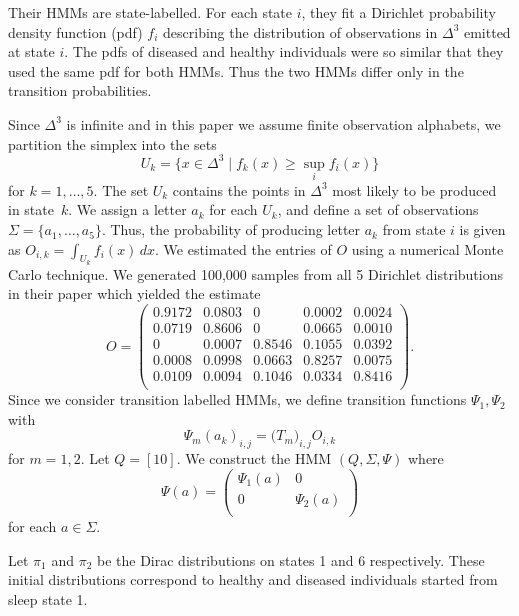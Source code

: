 \documentclass[a4paper,UKenglish,cleveref, autoref,mathscr]{lipics-v2019}
\newcommand{\1}{\mathbbm{1}}
\begin{document}
Their HMMs are state-labelled.
For each state $i$, they fit a Dirichlet probability density function (pdf) $f_i$ describing the distribution of observations in $\Delta^3$ emitted at state $i$.
The pdfs of diseased and healthy individuals were so similar that they used the same pdf for both HMMs. %
Thus the two HMMs differ only in the transition probabilities.

Since $\Delta^3$ is infinite and in this paper we assume finite observation alphabets, we partition the simplex into the sets
\[
 U_k = \{x \in \Delta^3 \mid f_k(x) \geq \sup_{i} f_i(x)\}
\]
for $k = 1, \dots, 5$.
The set $U_k$ contains the points in $\Delta^3$ most likely to be produced in state~$k$.
We assign a letter $a_k$ for each $U_k$, and define a set of observations $\Sigma = \{a_1, \dots, a_5\}$.
Thus, the probability of producing letter $a_k$ from state $i$ is given as $O_{i,k} = \int_{U_k} f_i(x)\, dx$. We estimated the entries of $O$ using a numerical Monte Carlo technique. We generated 100,000 samples from all 5 Dirichlet distributions in their paper which yielded the estimate
\begin{equation*}
O = \begin{pmatrix}
0.9172&0.0803&0&0.0002&0.0024\\
0.0719&0.8606&0&0.0665&0.0010\\
0&0.0007&0.8546&0.1055&0.0392\\
0.0008&0.0998&0.0663&0.8257&0.0075\\
0.0109&0.0094&0.1046&0.0334&0.8416\\
\end{pmatrix}.
\end{equation*}
Since we consider transition labelled HMMs, we define transition functions $\Psi_1, \Psi_2$ with
\[
 \Psi_m(a_k)_{i,j} = \big( T_m \big)_{i,j} O_{i,k}
\] for $m = 1, 2$.
Let $Q = [10]$. We construct the HMM $(Q, \Sigma, \Psi)$ where
\begin{equation*}
\Psi(a) = \begin{pmatrix}
\Psi_1(a) & 0 \\
0 & \Psi_2(a) \\
\end{pmatrix}
\end{equation*}
for each $a \in \Sigma$.

Let $\pi_1$ and $\pi_2$ be the Dirac distributions on states 1 and 6 respectively. These initial distributions correspond to healthy and diseased individuals started from sleep state 1.
\end{document}
